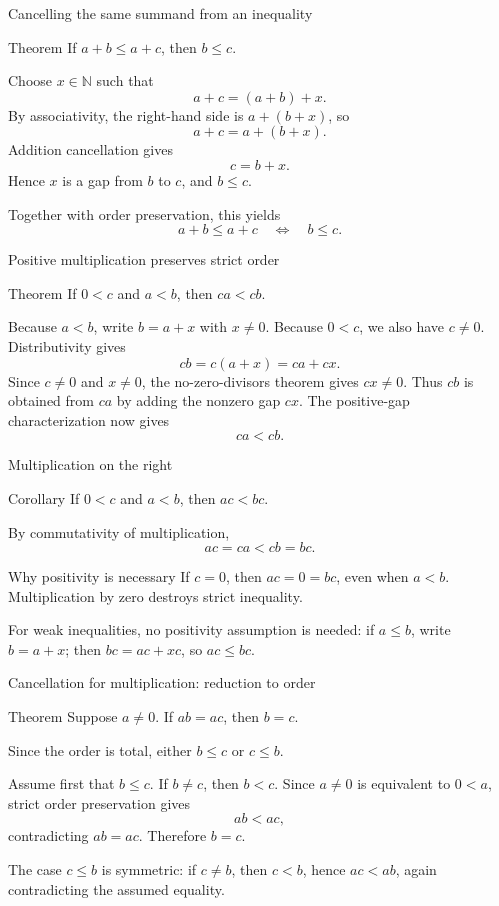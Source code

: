 \documentclass[aspectratio=169,11pt]{beamer}
\newcommand{\N}{\mathbb N}
\begin{document}
\begin{frame}{Cancelling the same summand from an inequality}
  \begin{block}{Theorem}
    If \(a+b\le a+c\), then \(b\le c\).
  \end{block}

  Choose \(x\in\N\) such that
  \[
    a+c=(a+b)+x.
  \]
  By associativity, the right-hand side is \(a+(b+x)\), so
  \[
    a+c=a+(b+x).
  \]
  Addition cancellation gives
  \[
    c=b+x.
  \]
  Hence \(x\) is a gap from \(b\) to \(c\), and \(b\le c\).

  Together with order preservation, this yields
  \[
    a+b\le a+c\quad\Longleftrightarrow\quad b\le c.
  \]
\end{frame}

\begin{frame}{Positive multiplication preserves strict order}
  \begin{block}{Theorem}
    If \(0<c\) and \(a<b\), then \(ca<cb\).
  \end{block}

  Because \(a<b\), write \(b=a+x\) with \(x\ne0\).  Because \(0<c\), we also
  have \(c\ne0\).  Distributivity gives
  \[
    cb=c(a+x)=ca+cx.
  \]
  Since \(c\ne0\) and \(x\ne0\), the no-zero-divisors theorem gives
  \(cx\ne0\).  Thus \(cb\) is obtained from \(ca\) by adding the nonzero gap
  \(cx\).  The positive-gap characterization now gives
  \[
    ca<cb.
  \]
\end{frame}

\begin{frame}{Multiplication on the right}
  \begin{block}{Corollary}
    If \(0<c\) and \(a<b\), then \(ac<bc\).
  \end{block}

  By commutativity of multiplication,
  \[
    ac=ca<cb=bc.
  \]

  \begin{alertblock}{Why positivity is necessary}
    If \(c=0\), then \(ac=0=bc\), even when \(a<b\).  Multiplication by zero
    destroys strict inequality.
  \end{alertblock}

  For weak inequalities, no positivity assumption is needed: if \(a\le b\),
  write \(b=a+x\); then \(bc=ac+xc\), so \(ac\le bc\).
\end{frame}

\begin{frame}{Cancellation for multiplication: reduction to order}
  \begin{block}{Theorem}
    Suppose \(a\ne0\).  If \(ab=ac\), then \(b=c\).
  \end{block}

  Since the order is total, either \(b\le c\) or \(c\le b\).

  Assume first that \(b\le c\).  If \(b\ne c\), then \(b<c\).  Since
  \(a\ne0\) is equivalent to \(0<a\), strict order preservation gives
  \[
    ab<ac,
  \]
  contradicting \(ab=ac\).  Therefore \(b=c\).

  The case \(c\le b\) is symmetric: if \(c\ne b\), then \(c<b\), hence
  \(ac<ab\), again contradicting the assumed equality.
\end{frame}
\end{document}
